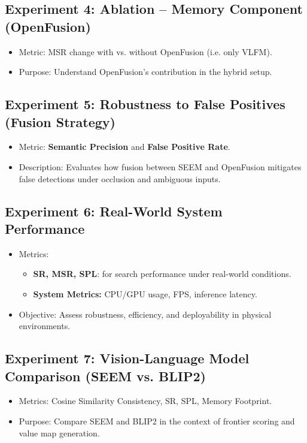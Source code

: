 \subsection{Experiment 4: Ablation – Memory Component (OpenFusion)}
\begin{itemize}
    \item Metric: MSR change with vs. without OpenFusion (i.e. only \ac{VLFM}).
    \item Purpose: Understand OpenFusion’s contribution in the hybrid setup.
\end{itemize}

\subsection{Experiment 5: Robustness to False Positives (Fusion Strategy)}
\begin{itemize}
    \item Metric: \textbf{Semantic Precision} and \textbf{False Positive Rate}.
    \item Description: Evaluates how fusion between \ac{SEEM} and OpenFusion mitigates false detections under occlusion and ambiguous inputs.
\end{itemize}

\subsection{Experiment 6: Real-World System Performance}
\begin{itemize}
    \item Metrics:
        \begin{itemize}
            \item \textbf{SR, MSR, SPL}: for search performance under real-world conditions.
            \item \textbf{System Metrics:} CPU/GPU usage, FPS, inference latency.
        \end{itemize}
    \item Objective: Assess robustness, efficiency, and deployability in physical environments.
\end{itemize}

\subsection{Experiment 7: Vision-Language Model Comparison (SEEM vs. BLIP2)}
\begin{itemize}
    \item Metrics: Cosine Similarity Consistency, SR, SPL, Memory Footprint.
    \item Purpose: Compare SEEM and BLIP2 in the context of frontier scoring and value map generation.
\end{itemize}
